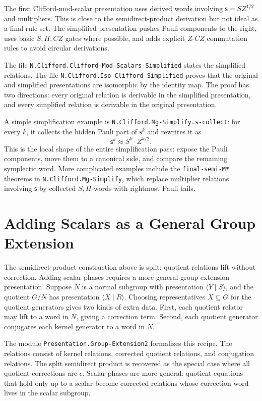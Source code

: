 \documentclass[acmsmall,screen,review,anonymous]{acmart}
\newcommand{\code}[1]{\texttt{#1}}
\newcommand{\codepath}[1]{\nolinkurl{#1}}
\begin{document}
The first Clifford-mod-scalar presentation uses derived words involving
\(\mathsf{s}=S Z^{1/2}\) and multipliers. This is close to the semidirect-product
derivation but not ideal as a final rule set. The simplified presentation pushes
Pauli components to the right, uses basic \(S,H,CZ\) gates where possible, and
adds explicit \(Z\)-\(CZ\) commutation rules to avoid circular derivations.

The file \code{N.Clifford.Clifford-Mod-Scalars-Simplified} states the simplified
relations. The file \code{N.Clifford.Iso-Clifford-Simplified} proves that the
original and simplified presentations are isomorphic by the identity map. The
proof has two directions: every original relation is derivable in the simplified
presentation, and every simplified relation is derivable in the original
presentation.

A simple simplification example is \codepath{N.Clifford.Mg-Simplify.s-collect}:
for every \(k\), it collects the hidden Pauli part of \(\mathsf{s}^k\) and
rewrites it as
\[
  \mathsf{s}^k \approx S^k \cdot Z^{k/2}.
\]
This is the local shape of the entire simplification pass: expose the Pauli
components, move them to a canonical side, and compare the remaining
symplectic word. More complicated examples include the \code{final-semi-M*}
theorems in \code{N.Clifford.Mg-Simplify}, which replace multiplier relations
involving \(\mathsf{s}\) by collected \(S,H\)-words with rightmost Pauli tails.

\section{Adding Scalars as a General Group Extension}
\label{sec:scalars}

The semidirect-product construction above is split: quotient relations lift
without correction. Adding scalar phases requires a more general group-extension
presentation. Suppose \(N\) is a normal subgroup with presentation
\(\langle Y \mid S\rangle\), and the quotient \(G/N\) has presentation
\(\langle \overline{X}\mid\overline{R}\rangle\). Choosing representatives
\(X\subseteq G\) for the quotient generators gives two kinds of extra data.
First, each quotient relator may lift to a word in \(N\), giving a correction
term. Second, each quotient generator conjugates each kernel generator to a word
in \(N\).

The module \code{Presentation.Group-Extension2} formalizes this recipe. The
relations consist of kernel relations, corrected quotient relations, and
conjugation relations. The split semidirect product is recovered as the special
case where all quotient corrections are \(\epsilon\). Scalar phases are more
general: quotient equations that hold only up to a scalar become corrected
relations whose correction word lives in the scalar subgroup.
\end{document}

